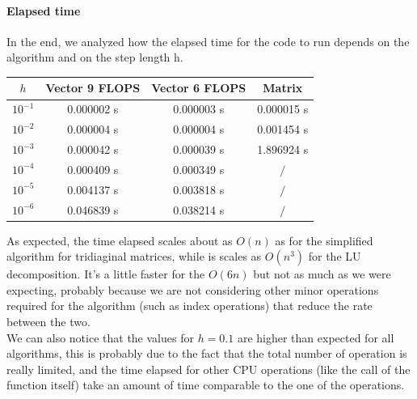\documentclass[10pt,a4paper,titlepage]{article}
\begin{document}
\paragraph{Elapsed time}
In the end, we analyzed how the elapsed time for the code to run depends on the algorithm and on the step length h. 
\begin{center}
\begin{tabular}{ |c|c|c|c| }
\hline
$h$ & Vector 9 FLOPS & Vector 6 FLOPS & Matrix \\\hline
  $10^{-1}$      & 0.000002 s& 0.000003 s& 0.000015 s \\\hline
  $10^{-2}$    & 0.000004 s& 0.000004 s& 0.001454 s \\\hline
  $10^{-3}$  & 0.000042 s& 0.000039 s& 1.896924 s \\\hline
  $10^{-4}$ & 0.000409 s& 0.000349 s& $/$\\\hline
  $10^{-5}$ & 0.004137 s& 0.003818 s& $/$\\\hline
  $10^{-6}$ & 0.046839 s& 0.038214 s& $/$\\\hline
\end{tabular}
\end{center}
As expected, the time elapsed scales about as $O(n)$ as for the simplified algorithm for tridiaginal matrices,  while is scales as $O(n^3)$ for the LU decomposition.  It's a little faster for the $O(6n)$ but not as much as we were expecting, probably because we are not considering other minor operations required for the algorithm (such as index operations) that reduce the rate between the two. \\
We can also notice that the values for $h = 0.1$ are higher than expected for all algorithms, this is probably due to the fact that the total number of operation is really limited, and the time elapsed for other CPU operations (like the call of the function itself) take an amount of time comparable to the one of the operations.
\end{document}
